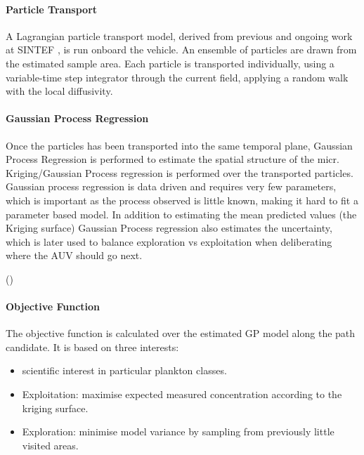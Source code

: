 \documentclass[conference]{IEEEtran}
\newcommand{\cmt}[1]{{\color{red}{#1}}}
\begin{document}
\paragraph{Particle Transport}
A Lagrangian particle transport model, derived from previous and ongoing
work at SINTEF \cite{Rye2006}, is run onboard the vehicle.
An ensemble of particles are drawn from the estimated sample area.
Each particle is transported individually, using a variable-time step
integrator \cite{Dormand1980} through the current field, applying a random walk with the local diffusivity.

\paragraph{Gaussian Process Regression} 
Once the particles has been transported into the same temporal plane, Gaussian Process Regression is performed to estimate the spatial structure of the micr. 
Kriging/Gaussian Process regression is performed over the transported
particles. 
Gaussian process regression is data driven and requires very few parameters, which is important as the process observed is little known, making it hard to fit a parameter based model.
In addition to estimating the mean predicted values (the Kriging surface)
Gaussian Process regression also estimates the uncertainty, which is
later used to balance exploration vs exploitation when deliberating
where the AUV should go next. 

(\cmt{Cite. This is confusing; are you
  using a GP with the hydro-dynamic flow? I suspect what you want to
  say is, once a hot-spot has been identified, then to understand its
  spatial structure (size, extant and potentially as a result, the
  community (of the micro-organism) structure), one needs to do a GP
  (a la, work in Runde). Right?})

\paragraph{Objective Function}

The objective function is calculated over the estimated GP model along
the path candidate.  It is based on three interests:

\begin{itemize}

    \item scientific interest in particular plankton classes. 
    \item Exploitation: maximise expected measured concentration
      according to the kriging surface. 
    \item Exploration: minimise model variance by sampling from
      previously little visited areas. 

\end{itemize}
\end{document}
